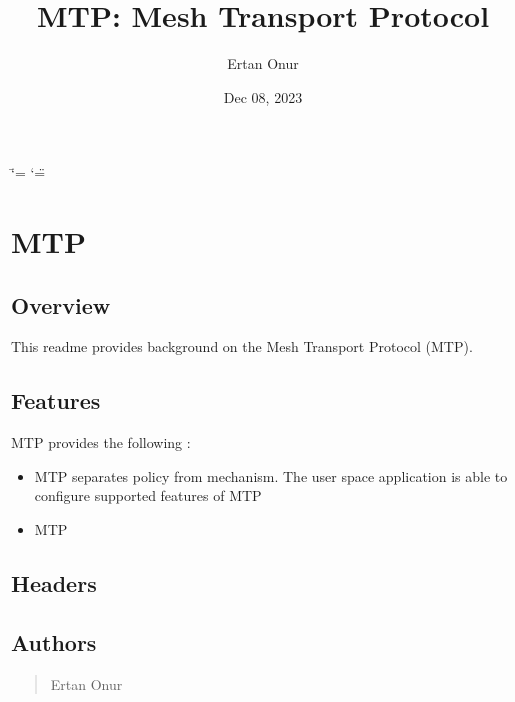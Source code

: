 \documentclass[letterpaper,10pt,english]{sphinxmanual}
\title{MTP: Mesh Transport Protocol}
\date{Dec 08, 2023}
\author{Ertan Onur}
\begin{document}
\ifdefined\shorthandoff
  \ifnum\catcode`\=\string=\active\shorthandoff{=}\fi
  \ifnum\catcode`\"=\active{}\fi
\fi

\pagestyle{empty}
\sphinxmaketitle
\pagestyle{plain}
\sphinxtableofcontents
\pagestyle{normal}
\label{\detokenize{index::doc}}


\sphinxstepscope


\chapter{MTP}
\label{\detokenize{mtp:mtp}}\label{\detokenize{mtp::doc}}

\section{Overview}
\label{\detokenize{mtp:overview}}
\sphinxAtStartPar
This readme provides background on the Mesh Transport Protocol (MTP).


\section{Features}
\label{\detokenize{mtp:features}}
\sphinxAtStartPar
MTP provides the following :
\begin{itemize}
\item {} 
\sphinxAtStartPar
MTP separates policy from mechanism. The user space
application is able to configure supported features of MTP

\item {} 
\sphinxAtStartPar
MTP

\end{itemize}


\section{Headers}
\label{\detokenize{mtp:headers}}

\section{Authors}
\label{\detokenize{mtp:authors}}\begin{quote}\begin{description}
\sphinxAtStartPar
Ertan Onur

\end{description}\end{quote}
\end{document}
